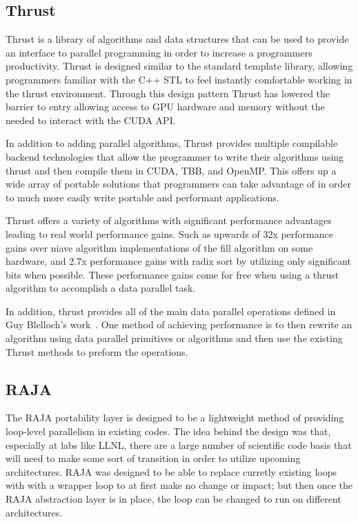 \subsection*{\textbf{Thrust}}

Thrust is a library of algorithms and data structures that can be used to provide an interface to parallel programming in order to increase a programmers productivity.
%
Thrust is designed similar to the standard template library, allowing programmers familiar with the C++ STL to feel instantly comfortable working in the thrust environment.
%
Through this design pattern Thrust has lowered the barrier to entry allowing access to GPU hardware and memory without the needed to interact with the CUDA API.
%
\cite{hoberock2010thrust}

In addition to adding parallel algorithms, Thrust provides multiple compilable backend technologies that allow the programmer to write their algorithms using thrust and then compile them in CUDA, TBB, and OpenMP.
%
This offers up a wide array of portable solutions that programmers can take advantage of in order to much more easily write portable and performant applications.
\cite{thrust}

Thrust offers a variety of algorithms with significant performance advantages leading to real world performance gains.
%
Such as upwards of 32x performance gains over niave algorithm implementations of the fill algorithm on some hardware, and 2.7x performance gains with radix sort by utilizing only significant bits when possible.
%
These performance gains come for free when using a thrust algorithm to accomplish a data parallel task.
%
~\cite{bell2011thrust}

In addition, thrust provides all of the main data parallel operations defined in Guy Blelloch's work~\cite{blelloch1990vector}.
%
One method of achieving performance is to then rewrite an algorithm using data parallel primitives or algorithms and then use the existing Thrust methods to preform the operations.

\subsection*{\textbf{RAJA}}

The RAJA portability layer is designed to be a lightweight method of providing loop-level parallelism in existing codes.
%
The idea behind the design was that, especially at labs like LLNL, there are a large number of scientific code basis that will need to make some sort of transition in order to utilize upcoming architectures.
%
RAJA was designed to be able to replace curretly existing loops with with a wrapper loop to at first make no change or impact; but then
%
once the RAJA abstraction layer is in place, the loop can be changed to run on different architectures.
%
\cite{hornung2014raja}
\cite{hornung2016raja}

